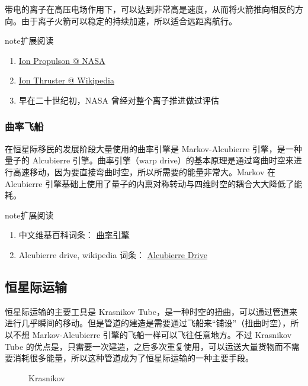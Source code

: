 \documentclass[letterpaper,10pt]{sphinxmanual}
\begin{document}
带电的离子在高压电场作用下，可以达到非常高是速度，从而将火箭推向相反的方向。由于离子火箭可以稳定的持续加速，所以适合远距离航行。

\begin{notice}{note}{扩展阅读}
\begin{enumerate}
\item {} 
\href{http://www.nasa.gov/centers/glenn/about/fs21grc.html}{Ion Propulson @ NASA}

\item {} 
\href{https://en.wikipedia.org/wiki/Ion\_thruster}{Ion Thruster @ Wikipedia}

\item {} 
早在二十世纪初，NASA 曾经对整个离子推进做过评估
\begin{figure}[htbp]
\centering
\end{figure}

\end{enumerate}
\end{notice}


\subsubsection{曲率飞船}
\label{tech:id5}
在恒星际移民的发展阶段大量使用的曲率引擎是 Markov-Alcubierre 引擎，是一种量子的 Alcubierre 引擎。曲率引擎（warp drive）的基本原理是通过弯曲时空来进行高速移动，因为要直接弯曲时空，所以所需要的能量非常大。Markov 在 Alcubierre 引擎基础上使用了量子的内禀对称转动与四维时空的耦合大大降低了能耗。

\begin{notice}{note}{扩展阅读}
\begin{enumerate}
\item {} 
中文维基百科词条： \href{http://zh.wikipedia.org/wiki/\%E6\%9B\%B2\%E9\%80\%9F\%E5\%BC\%95\%E6\%93\%8E\#.E6.9B.B2.E9.80.9F.E9.80.9F.E5.BA.A6}{曲率引擎}

\item {} 
Alcubierre drive, wikipedia 词条： \href{http://en.wikipedia.org/wiki/Alcubierre\_drive}{Alcubierre Drive}

\end{enumerate}
\end{notice}


\subsection{恒星际运输}
\label{tech:id7}
恒星际运输的主要工具是 Krasnikov Tube，是一种时空的扭曲，可以通过管道来进行几乎瞬间的移动。但是管道的建造是需要通过飞船来“铺设”（扭曲时空），所以不想 Markov-Alcubierre 引擎的飞船一样可以飞往任意地方。不过 Krasnikov Tube 的优点是，只需要一次建造，之后多次重复使用，可以运送大量货物而不需要消耗很多能量，所以这种管道成为了恒星际运输的一种主要手段。
\begin{figure}[htbp]
\centering
\capstart
\caption{Krasnikov}\end{figure}
\end{document}
